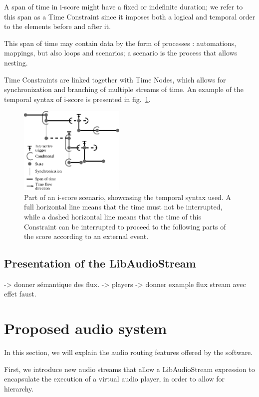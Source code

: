 \documentclass{article}
\begin{document}
A span of time in i-score might have a fixed or indefinite duration;
we refer to this span as a Time Constraint since it imposes both a logical and temporal order to the elements before and after it.
 
This span of time may contain data by the form of processes : automations, mappings, but also loops and scenarios; a scenario is the process that allows nesting. 

Time Constraints are linked together with Time Nodes, which allows for synchronization and branching of multiple streams of time.
An example of the temporal syntax of i-score is presented in fig.~\ref{fig.iscore-example}.

\begin{figure}
	\centering
	\includegraphics[width=0.45\textwidth]{figures/iscore-example.eps}
	\caption{Part of an i-score scenario, showcasing the temporal syntax used. 
		A full horizontal line means that the time must not be interrupted, 
		while a dashed horizontal line means that the time of this Constraint can be interrupted to proceed 
		to the following parts of the score according to an external event.}
	\label{fig.iscore-example}
\end{figure}

\subsection{Presentation of the LibAudioStream}
-> donner sémantique des flux.
-> players
-> donner example flux stream avec effet faust.

\section{Proposed audio system}
In this section, we will explain the audio routing 
features offered by the software.

First, we introduce new audio streams that allow a LibAudioStream
expression to encapsulate the execution of a virtual audio player, 
in order to allow for hierarchy.
\end{document}

